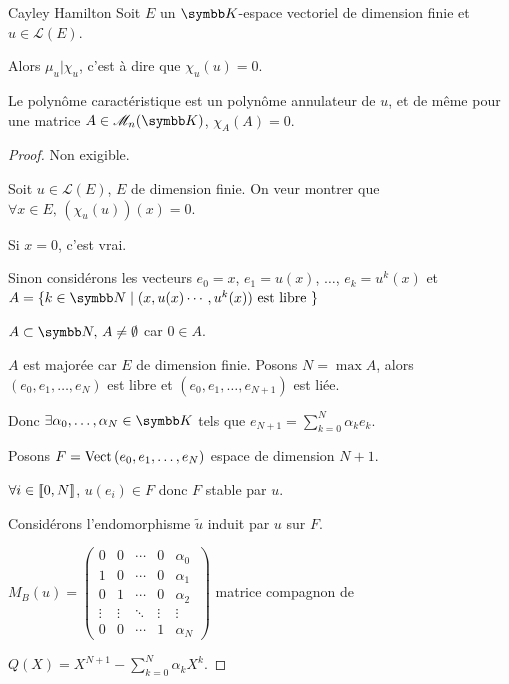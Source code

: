 \begin{theoreme}{Cayley Hamilton}{}
    Soit $E$ un $\K$-espace vectoriel de dimension finie et $u \in \mathscr L(E)$.

    Alors $\mu_u | \chi_u$, c'est à dire que $\chi_u(u) = 0$. 

    Le polynôme caractéristique est un polynôme annulateur de $u$, et de même 
    pour une matrice $A \in \mathscr M_n(\K)$, $\chi_A(A) = 0$.
\end{theoreme}


\begin{proof}
    Non exigible.

    Soit $u \in \mathscr L(E)$, $E$ de dimension finie. On veur montrer que 
    $\forall x \in E, \, (\chi_u(u))(x) = 0$.

    Si $x = 0$, c'est vrai. 

    Sinon considérons les vecteurs $e_0 = x$, $e_1 = u(x)$, $\ldots$, $e_k = u^k(x)$ 
    et $A = \{k \in \N \mid (x, u(x) \cdots, u^k(x)) \text{ est libre }\}$

    $A \subset \N, \, A \neq \emptyset$ car $0 \in A$.

    $A$ est majorée car $E$ de dimension finie. Posons $N = \max A$, alors $(e_0, e_1, \ldots, e_N)$ est libre et
    $(e_0, e_1, \ldots, e_{N + 1})$ est liée.

    Donc $\exists \alpha_0, \ldots, \alpha_N \in \K$ tels que
    $e_{N + 1} = \sum_{k = 0 }^{ N } \alpha_k e_k$.

    Posons $F = \operatorname{Vect} \,(e_0, e_1, \ldots, e_N)$ espace de dimension $N + 1$. 

    $\forall i \in [\![0, N]\!]$, $u(e_i) \in F$ donc $F$ stable par $u$.

    Considérons l'endomorphisme $\tilde u $ induit par $u$ sur $F$.

    $M_B(u) = \begin{pmatrix}
        0 & 0 & \cdots & 0 & \alpha_0 \\
        1 & 0 & \cdots & 0 & \alpha_1 \\
        0 & 1 & \cdots & 0 & \alpha_2 \\
        \vdots & \vdots & \ddots & \vdots & \vdots \\
        0 & 0 & \cdots & 1 & \alpha_N
    \end{pmatrix}$ matrice compagnon de 
    
    $\displaystyle Q(X) = X^{N + 1} - \sum_{k = 0 }^{ N } \alpha_k X^k$.


\end{proof}
